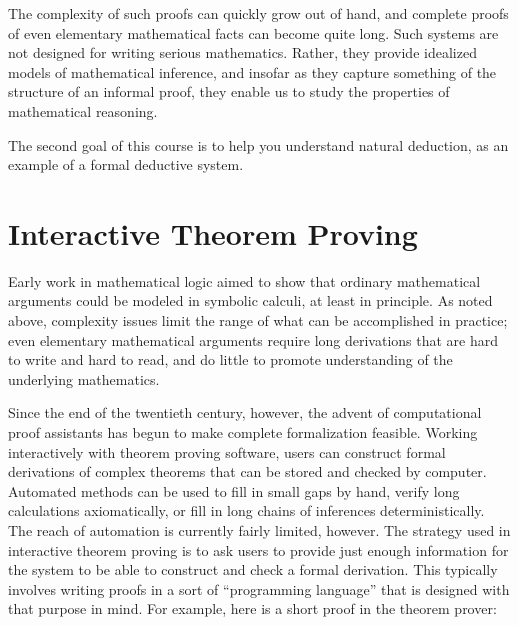 \documentclass[letterpaper,10pt,english]{sphinxmanual}
\begin{document}
\sphinxAtStartPar
The complexity of such proofs can quickly grow out of hand, and complete proofs of even elementary mathematical facts can become quite long. Such systems are not designed for writing serious mathematics. Rather, they provide idealized models of mathematical inference, and insofar as they capture something of the structure of an informal proof, they enable us to study the properties of mathematical reasoning.

\sphinxAtStartPar
The second goal of this course is to help you understand natural deduction, as an example of a formal deductive system.


\section{Interactive Theorem Proving}
\label{\detokenize{introduction:interactive-theorem-proving}}
\sphinxAtStartPar
Early work in mathematical logic aimed to show that ordinary mathematical arguments could be modeled in symbolic calculi, at least in principle. As noted above, complexity issues limit the range of what can be accomplished in practice; even elementary mathematical arguments require long derivations that are hard to write and hard to read, and do little to promote understanding of the underlying mathematics.

\sphinxAtStartPar
Since the end of the twentieth century, however, the advent of computational proof assistants has begun to make complete formalization feasible. Working interactively with theorem proving software, users can construct formal derivations of complex theorems that can be stored and checked by computer. Automated methods can be used to fill in small gaps by hand, verify long calculations axiomatically, or fill in long chains of inferences deterministically. The reach of automation is currently fairly limited, however. The strategy used in interactive theorem proving is to ask users to provide just enough information for the system to be able to construct and check a formal derivation. This typically involves writing proofs in a sort of “programming language” that is designed with that purpose in mind. For example, here is a short proof in the  theorem prover:

\begin{sphinxVerbatim}[commandchars=\\\{\}]
    

           
       
   
     
     
\end{sphinxVerbatim}
\end{document}
